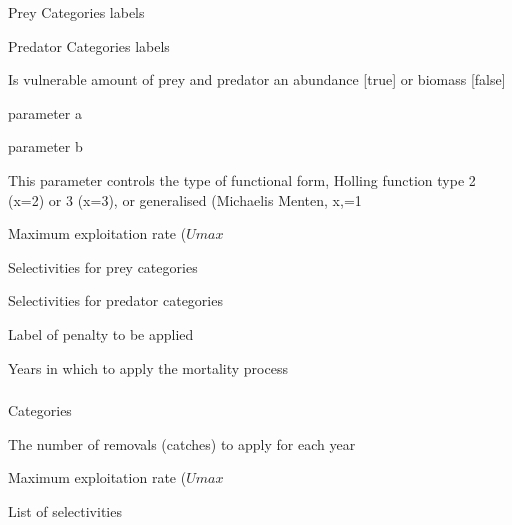  {Prey Categories labels}

 {Predator Categories labels}

 {Is vulnerable amount of prey and predator an abundance [true] or biomass [false]}

 {parameter a}

 {parameter b}

 {This parameter controls the type of functional form, Holling function type 2 (x=2) or 3 (x=3), or generalised (Michaelis Menten, x,=1}

 {Maximum exploitation rate ($Umax$}

 {Selectivities for prey categories}

 {Selectivities for predator categories}

 {Label of penalty to be applied}

 {Years in which to apply the mortality process}

\subsubsection[Mortality Initialisation Event]{}

 {Categories}

 {The number of removals (catches) to apply for each year}

 {Maximum exploitation rate ($Umax$}

 {List of selectivities}

